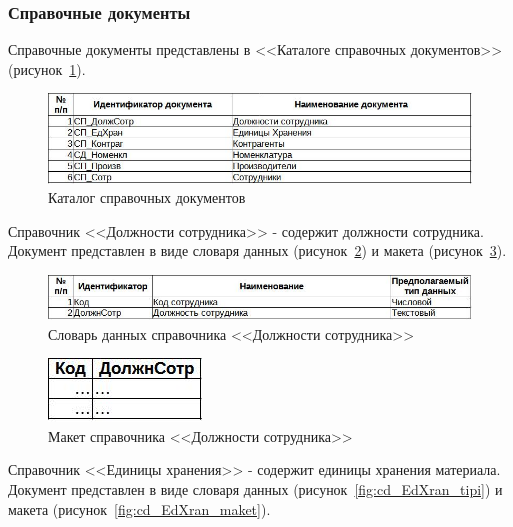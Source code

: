 \documentclass[12pt, a4paper, simple]{eskdtext}
\begin{document}
    \subsubsection{Справочные документы}

    Справочные документы представлены в <<Каталоге справочных документов>> (рисунок~\ref{fig:cd}).

    \begin{figure}[!h]
        \centering
        \includegraphics[width=14cm]
            {_docs/СП_.jpg}
        \caption{Каталог справочных документов}
        \label{fig:cd}
    \end{figure}

    Справочник <<Должности сотрудника>> - содержит должности сотрудника.
    Документ представлен в виде словаря данных (рисунок~\ref{fig:cd_DoljnCotr_tipi})
    и макета (рисунок~\ref{fig:cd_DoljnCotr_maket}).

    \begin{figure}[!h]
        \centering
        \includegraphics[width=14cm]
            {_docs/СП_ДолжнСотр_типы.jpg}
        \caption{Словарь данных справочника <<Должности сотрудника>>}
        \label{fig:cd_DoljnCotr_tipi}
    \end{figure}

    \begin{figure}[!h]
        \centering
        \includegraphics[]
            {_docs/СП_ДолжнСотр_макет.jpg}
        \caption{Макет справочника <<Должности сотрудника>>}
        \label{fig:cd_DoljnCotr_maket}
    \end{figure}

    \newpage

    Справочник <<Единицы хранения>> - содержит единицы хранения материала.
    Документ представлен в виде словаря данных (рисунок~\ref{fig:cd_EdXran_tipi})
    и макета (рисунок~\ref{fig:cd_EdXran_maket}).
\end{document}
